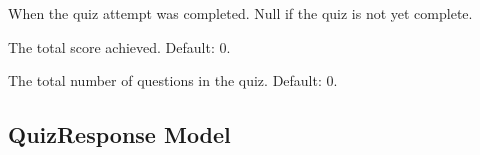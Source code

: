 \documentclass[letterpaper,10pt,english]{sphinxmanual}
\begin{document}
\begin{fulllineitems}
\begin{fulllineitems}
\end{fulllineitems}


\begin{fulllineitems}
\label{\detokenize{models:QuizAttempt.completed_at}}
\pysigstartsignatures
{}
\pysigstopsignatures
\sphinxAtStartPar
When the quiz attempt was completed.
Null if the quiz is not yet complete.

\end{fulllineitems}


\begin{fulllineitems}
\label{\detokenize{models:QuizAttempt.score}}
\pysigstartsignatures
{}
\pysigstopsignatures
\sphinxAtStartPar
The total score achieved.
Default: 0.

\end{fulllineitems}


\begin{fulllineitems}
\label{\detokenize{models:QuizAttempt.total_questions}}
\pysigstartsignatures
{}
\pysigstopsignatures
\sphinxAtStartPar
The total number of questions in the quiz.
Default: 0.

\end{fulllineitems}


\end{fulllineitems}



\subsection{QuizResponse Model}
\label{\detokenize{models:quizresponse-model}}
\end{document}
